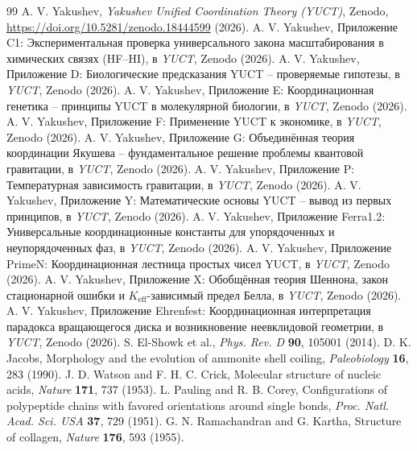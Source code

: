 \documentclass[12pt]{article}
\begin{document}
	\begin{thebibliography}{99}
		A. V. Yakushev, \emph{Yakushev Unified Coordination Theory (YUCT)}, Zenodo, \url{https://doi.org/10.5281/zenodo.18444599} (2026).
		A. V. Yakushev, Приложение C1: Экспериментальная проверка универсального закона масштабирования в химических связях (HF–HI), в \emph{YUCT}, Zenodo (2026).
		A. V. Yakushev, Приложение D: Биологические предсказания YUCT – проверяемые гипотезы, в \emph{YUCT}, Zenodo (2026).
		A. V. Yakushev, Приложение E: Координационная генетика – принципы YUCT в молекулярной биологии, в \emph{YUCT}, Zenodo (2026).
		A. V. Yakushev, Приложение F: Применение YUCT к экономике, в \emph{YUCT}, Zenodo (2026).
		A. V. Yakushev, Приложение G: Объединённая теория координации Якушева – фундаментальное решение проблемы квантовой гравитации, в \emph{YUCT}, Zenodo (2026).
		A. V. Yakushev, Приложение P: Температурная зависимость гравитации, в \emph{YUCT}, Zenodo (2026).
		A. V. Yakushev, Приложение Y: Математические основы YUCT – вывод из первых принципов, в \emph{YUCT}, Zenodo (2026).
		A. V. Yakushev, Приложение Ferra1.2: Универсальные координационные константы для упорядоченных и неупорядоченных фаз, в \emph{YUCT}, Zenodo (2026).
		A. V. Yakushev, Приложение PrimeN: Координационная лестница простых чисел YUCT, в \emph{YUCT}, Zenodo (2026).
		A. V. Yakushev, Приложение X: Обобщённая теория Шеннона, закон стационарной ошибки и \(K_{\mathrm{eff}}\)-зависимый предел Белла, в \emph{YUCT}, Zenodo (2026).
		A. V. Yakushev, Приложение Ehrenfest: Координационная интерпретация парадокса вращающегося диска и возникновение неевклидовой геометрии, в \emph{YUCT}, Zenodo (2026).
		S. El-Showk et al., \emph{Phys. Rev. D} \textbf{90}, 105001 (2014).
		D. K. Jacobs, Morphology and the evolution of ammonite shell coiling, \emph{Paleobiology} \textbf{16}, 283 (1990).
		J. D. Watson and F. H. C. Crick, Molecular structure of nucleic acids, \emph{Nature} \textbf{171}, 737 (1953).
		L. Pauling and R. B. Corey, Configurations of polypeptide chains with favored orientations around single bonds, \emph{Proc. Natl. Acad. Sci. USA} \textbf{37}, 729 (1951).
		G. N. Ramachandran and G. Kartha, Structure of collagen, \emph{Nature} \textbf{176}, 593 (1955).

\end{thebibliography}
\end{document}
